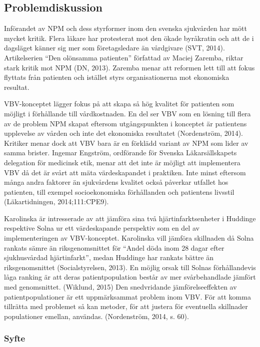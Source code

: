 \subsection{Problemdiskussion}

Införandet av NPM och dess styrformer inom den svenska sjukvården har mött
mycket kritik. Flera läkare har protesterat mot den ökade byråkratin och att de
i dagsläget känner sig mer som företagsledare än vårdgivare (SVT, 2014).
Artikelserien “Den olönsamma patienten” författad av Maciej Zaremba, riktar
stark kritik mot NPM (DN, 2013). Zaremba menar att reformen lett till att fokus flyttats från patienten och istället styrs organisationerna mot ekonomiska resultat.
 
VBV-konceptet lägger fokus på att skapa så hög kvalitet för patienten som möjligt i förhållande till vårdkostnaden. En del ser VBV som en lösning till flera av de problem NPM skapat eftersom utgångspunkten i konceptet är patientens upplevelse av vården och inte det ekonomiska resultatet (Nordenström, 2014). Kritiker menar dock att VBV bara är en förklädd variant av NPM som lider av samma brister. Ingemar Engström, ordförande för Svenska Läkarsällskapets delegation för medicinsk etik, menar att det inte är möjligt att implementera VBV då det är svårt att mäta värdeskapandet i praktiken. Inte minst eftersom många andra faktorer än sjukvårdens kvalitet också påverkar utfallet hos patienten, till exempel socioekonomiska förhållanden och patientens livsstil (Läkartidningen, 2014;111:CPE9).
 
Karolinska är intresserade av att jämföra sina två hjärtinfarktsenheter i
Huddinge respektive Solna ur ett värdeskapande perspektiv som en del av
implementeringen av VBV-konceptet. Karolinska vill jämföra skillnaden då Solna
rankats sämre än riksgenomsnittet för
“Andel döda inom 28 dagar efter sjukhusvårdad hjärtinfarkt”, medan Huddinge har
rankats bättre än riksgenomsnittet (Socialstyrelsen, 2013). En
möjlig orsak till Solnas förhållandevis låga ranking är att deras
patientpopulation består av mer svårbehandlade jämfört med genomsnittet. (Wiklund, 2015) Den snedvridande jämförelseeffekten av patientpopulationer är ett uppmärksammat problem inom VBV. För att komma tillrätta med problemet så kan metoder, för att justera för eventuella skillnader populationer emellan, användas. (Nordenström, 2014, s. 60).


\subsubsection{Syfte}


